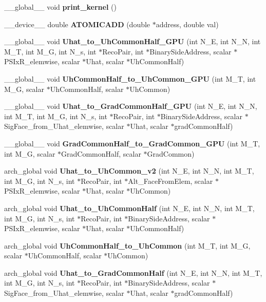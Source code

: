 \begin{DoxyCompactItemize}
\item 
\-\_\-\-\_\-global\-\_\-\-\_\- void {\bfseries print\-\_\-kernel} ()\label{kernels__phil_8cu_a9ab1b1059e3163f56a3f953160382ec7}

\item 
\-\_\-\-\_\-device\-\_\-\-\_\- double {\bf A\-T\-O\-M\-I\-C\-A\-D\-D} (double $\ast$address, double val)
\item 
\-\_\-\-\_\-global\-\_\-\-\_\- void {\bf Uhat\-\_\-to\-\_\-\-Uh\-Common\-Half\-\_\-\-G\-P\-U} (int N\-\_\-\-E, int N\-\_\-\-N, int M\-\_\-\-T, int M\-\_\-\-G, int N\-\_\-s, int $\ast$Reco\-Pair, int $\ast$Binary\-Side\-Address, scalar $\ast$P\-S\-Ix\-R\-\_\-elemwise, scalar $\ast$Uhat, scalar $\ast$Uh\-Common\-Half)
\item 
\-\_\-\-\_\-global\-\_\-\-\_\- void {\bf Uh\-Common\-Half\-\_\-to\-\_\-\-Uh\-Common\-\_\-\-G\-P\-U} (int M\-\_\-\-T, int M\-\_\-\-G, scalar $\ast$Uh\-Common\-Half, scalar $\ast$Uh\-Common)
\item 
\-\_\-\-\_\-global\-\_\-\-\_\- void {\bfseries Uhat\-\_\-to\-\_\-\-Grad\-Common\-Half\-\_\-\-G\-P\-U} (int N\-\_\-\-E, int N\-\_\-\-N, int M\-\_\-\-T, int M\-\_\-\-G, int N\-\_\-s, int $\ast$Reco\-Pair, int $\ast$Binary\-Side\-Address, scalar $\ast$Sig\-Face\-\_\-from\-\_\-\-Uhat\-\_\-elemwise, scalar $\ast$Uhat, scalar $\ast$grad\-Common\-Half)\label{kernels__phil_8cu_ad09bc959bb502e0146b127c8f18ed6fb}

\item 
\-\_\-\-\_\-global\-\_\-\-\_\- void {\bfseries Grad\-Common\-Half\-\_\-to\-\_\-\-Grad\-Common\-\_\-\-G\-P\-U} (int M\-\_\-\-T, int M\-\_\-\-G, scalar $\ast$Grad\-Common\-Half, scalar $\ast$Grad\-Common)\label{kernels__phil_8cu_a775060d9e862f4bb98ac46d3453f264a}

\item 
arch\-\_\-global void {\bf Uhat\-\_\-to\-\_\-\-Uh\-Common\-\_\-v2} (int N\-\_\-\-E, int N\-\_\-\-N, int M\-\_\-\-T, int M\-\_\-\-G, int N\-\_\-s, int $\ast$Reco\-Pair, int $\ast$Alt\-\_\-\-Face\-From\-Elem, scalar $\ast$P\-S\-Ix\-R\-\_\-elemwise, scalar $\ast$Uhat, scalar $\ast$Uh\-Common)
\item 
arch\-\_\-global void {\bf Uhat\-\_\-to\-\_\-\-Uh\-Common\-Half} (int N\-\_\-\-E, int N\-\_\-\-N, int M\-\_\-\-T, int M\-\_\-\-G, int N\-\_\-s, int $\ast$Reco\-Pair, int $\ast$Binary\-Side\-Address, scalar $\ast$P\-S\-Ix\-R\-\_\-elemwise, scalar $\ast$Uhat, scalar $\ast$Uh\-Common\-Half)
\item 
arch\-\_\-global void {\bf Uh\-Common\-Half\-\_\-to\-\_\-\-Uh\-Common} (int M\-\_\-\-T, int M\-\_\-\-G, scalar $\ast$Uh\-Common\-Half, scalar $\ast$Uh\-Common)
\item 
arch\-\_\-global void {\bfseries Uhat\-\_\-to\-\_\-\-Grad\-Common\-Half} (int N\-\_\-\-E, int N\-\_\-\-N, int M\-\_\-\-T, int M\-\_\-\-G, int N\-\_\-s, int $\ast$Reco\-Pair, int $\ast$Binary\-Side\-Address, scalar $\ast$Sig\-Face\-\_\-from\-\_\-\-Uhat\-\_\-elemwise, scalar $\ast$Uhat, scalar $\ast$grad\-Common\-Half)\label{kernels__phil_8cu_a2f944b16834f4f91f862df7dd8ef5c59}


\end{DoxyCompactItemize}
